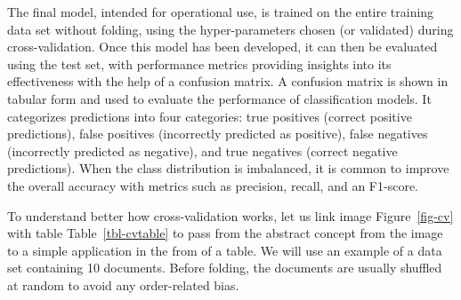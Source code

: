 The final model, intended for operational use, is trained on the entire
training data set without folding, using the hyper-parameters chosen (or validated) during cross-validation. Once this model has been developed, it can
then be evaluated using the test set, with performance metrics providing
insights into its effectiveness with the help of a confusion matrix. A
confusion matrix is shown in tabular form and used to evaluate the
performance of classification models. It categorizes predictions into
four categories: true positives (correct positive predictions), false
positives (incorrectly predicted as positive), false negatives
(incorrectly predicted as negative), and true negatives (correct
negative predictions). When the class distribution is imbalanced, it is common to improve the overall accuracy with metrics such as precision, recall, and an F1-score.

To understand better how cross-validation works, let us link
image Figure~\ref{fig-cv} with table Table~\ref{tbl-cvtable} to pass
from the abstract concept from the image to a simple application in the from of a
table. We will use an example of a data set containing 10 documents. Before folding, the documents are usually shuffled at random to avoid any order-related bias.

